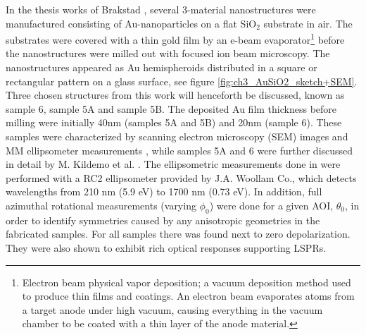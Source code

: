 In the thesis works of Brakstad \cite{brakstad_thesis}, several 3-material nanostructures were manufactured consisting of Au-nanoparticles on a flat SiO$_2$ substrate in air. The substrates were covered with a thin gold film by an e-beam evaporator\footnote{Electron beam physical vapor deposition; a vacuum deposition method used to produce thin films and coatings. An electron beam evaporates atoms from a target anode under high vacuum, causing everything in the vacuum chamber to be coated with a thin layer of the anode material.} before the nanostructures were milled out with focused ion beam microscopy.  The nanostructures appeared as Au hemispheroids distributed in a square or rectangular pattern on a glass surface, see figure \ref{fig:ch3_AuSiO2_sketch+SEM}. Three chosen structures from this work will henceforth be discussed, known as sample 6, sample 5A and sample 5B. The deposited Au film thickness before milling were initially 40nm (samples 5A and 5B) and 20nm (sample 6). These samples were characterized by scanning electron microscopy (SEM) images and MM ellipsometer measurements \cite{brakstad_thesis}, while samples 5A and 6 were further discussed in detail by M. Kildemo et al. \cite{Brakstad:15}\cite{Kildemo2017}. The ellipsometric measurements done in \cite{brakstad_thesis} were performed with a RC2 ellipsometer provided by J.A. Woollam Co., which detects wavelengths from 210 nm (5.9 eV) to 1700 nm (0.73 eV). In addition, full azimuthal rotational measurements (varying $\phi_0$) were done for a given AOI, $\theta_0$, in order to identify symmetries caused by any anisotropic geometries in the fabricated samples. For all samples there was found next to zero depolarization. They were also shown to exhibit rich optical responses supporting LSPRs\cite{brakstad_thesis}. 

